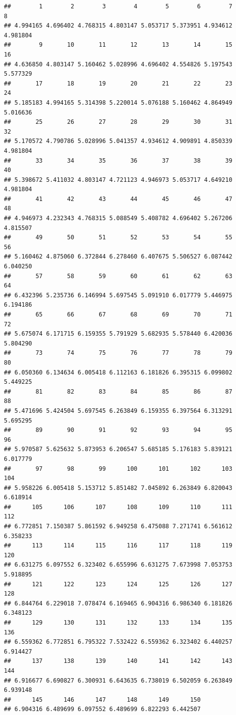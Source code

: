 \documentclass[
]{book}
\begin{document}
\begin{verbatim}
##        1        2        3        4        5        6        7        8 
## 4.994165 4.696402 4.768315 4.803147 5.053717 5.373951 4.934612 4.981804 
##        9       10       11       12       13       14       15       16 
## 4.636850 4.803147 5.160462 5.028996 4.696402 4.554826 5.197543 5.577329 
##       17       18       19       20       21       22       23       24 
## 5.185183 4.994165 5.314398 5.220014 5.076188 5.160462 4.864949 5.016636 
##       25       26       27       28       29       30       31       32 
## 5.170572 4.790786 5.028996 5.041357 4.934612 4.909891 4.850339 4.981804 
##       33       34       35       36       37       38       39       40 
## 5.398672 5.411032 4.803147 4.721123 4.946973 5.053717 4.649210 4.981804 
##       41       42       43       44       45       46       47       48 
## 4.946973 4.232343 4.768315 5.088549 5.408782 4.696402 5.267206 4.815507 
##       49       50       51       52       53       54       55       56 
## 5.160462 4.875060 6.372844 6.278460 6.407675 5.506527 6.087442 6.040250 
##       57       58       59       60       61       62       63       64 
## 6.432396 5.235736 6.146994 5.697545 5.091910 6.017779 5.446975 6.194186 
##       65       66       67       68       69       70       71       72 
## 5.675074 6.171715 6.159355 5.791929 5.682935 5.578440 6.420036 5.804290 
##       73       74       75       76       77       78       79       80 
## 6.050360 6.134634 6.005418 6.112163 6.181826 6.395315 6.099802 5.449225 
##       81       82       83       84       85       86       87       88 
## 5.471696 5.424504 5.697545 6.263849 6.159355 6.397564 6.313291 5.695295 
##       89       90       91       92       93       94       95       96 
## 5.970587 5.625632 5.873953 6.206547 5.685185 5.176183 5.839121 6.017779 
##       97       98       99      100      101      102      103      104 
## 5.958226 6.005418 5.153712 5.851482 7.045892 6.263849 6.820043 6.618914 
##      105      106      107      108      109      110      111      112 
## 6.772851 7.150387 5.861592 6.949258 6.475088 7.271741 6.561612 6.358233 
##      113      114      115      116      117      118      119      120 
## 6.631275 6.097552 6.323402 6.655996 6.631275 7.673998 7.053753 5.918895 
##      121      122      123      124      125      126      127      128 
## 6.844764 6.229018 7.078474 6.169465 6.904316 6.986340 6.181826 6.348123 
##      129      130      131      132      133      134      135      136 
## 6.559362 6.772851 6.795322 7.532422 6.559362 6.323402 6.440257 6.914427 
##      137      138      139      140      141      142      143      144 
## 6.916677 6.690827 6.300931 6.643635 6.738019 6.502059 6.263849 6.939148 
##      145      146      147      148      149      150 
## 6.904316 6.489699 6.097552 6.489699 6.822293 6.442507
\end{verbatim}
\end{document}
